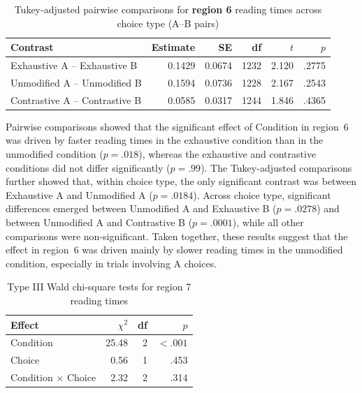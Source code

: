 \documentclass[a4paper, ruler]{CUP-JNL-LIN}%
\begin{document}
\begin{table}[htbp]
\centering
\caption{Tukey-adjusted pairwise comparisons for \textbf{region 6} reading times across choice type (A--B pairs)}
\label{tab:r6-pairwise-across-choice}
\begin{tabularx}{\textwidth}{@{}Xrrrrr@{}}
\toprule
Contrast & Estimate & SE & df & $t$ & $p$ \\
\midrule
Exhaustive A -- Exhaustive B   &  0.1429 & 0.0674 & 1232 &  2.120 & .2775 \\
Unmodified A -- Unmodified B   &  0.1594 & 0.0736 & 1228 &  2.167 & .2543 \\
Contrastive A -- Contrastive B &  0.0585 & 0.0317 & 1244 &  1.846 & .4365 \\
\bottomrule
\end{tabularx}
\end{table}

Pairwise comparisons showed that the significant effect of Condition in region~6 was driven by faster reading times in the exhaustive condition than in the unmodified condition ($p=.018$), whereas the exhaustive and contrastive conditions did not differ significantly ($p=.99$). The Tukey-adjusted comparisons further showed that, within choice type, the only significant contrast was between Exhaustive A and Unmodified A ($p=.0184$). Across choice type, significant differences emerged between Unmodified A and Exhaustive B ($p=.0278$) and between Unmodified A and Contrastive B ($p=.0001$), while all other comparisons were non-significant. Taken together, these results suggest that the effect in region~6 was driven mainly by slower reading times in the unmodified condition, especially in trials involving A choices.





\begin{table}[htbp]
\centering
\caption{Type III Wald chi-square tests for region 7 reading times}
\label{tab:r7}
\begin{tabularx}{\textwidth}{@{}Xrrr@{}}
\toprule
Effect & $\chi^2$ & df & $p$ \\
\midrule
Condition & 25.48 & 2 & $< .001$ \\
Choice & 0.56 & 1 & .453 \\
Condition $\times$ Choice & 2.32 & 2 & .314 \\
\bottomrule
\end{tabularx}
\end{table}
\end{document}
